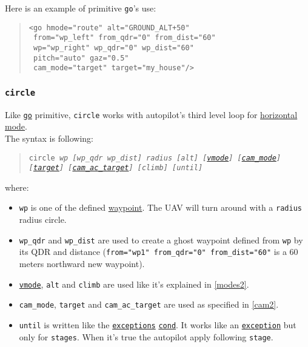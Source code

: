 \documentclass{article}
\renewcommand{\tt}[1]{\texttt{#1}}
\newcommand{\ex}[1]{\colorbox[gray]{0.92}{\tt{#1}}}
\newcommand{\hs}[1]{\hspace*{#1cm}}
\newcommand{\until}{%
	\tt{until} is written like the \tt{\hyperlink{exceptions}{exceptions}}
		\tt{\hyperlink{cond}{cond}}. It works like an
		\tt{\hyperlink{exceptions}{exception}} but only for \tt{stages}.
		When it's true the autopilot apply following \tt{stage}.
}
\newcommand{\qt}[1]{\textcolor{gris75}{#1}}
\begin{document}
\begin{minipage}[ctb]{\textwidth}
Here is an example of primitive \tt{go}'s use:
\begin{quote}
	\ex{<go hmode="\qt{route}" alt="\qt{GROUND\_ALT+50}"} \\ 
	\ex{\hs{0.58} from="\qt{wp\_left}" from\_qdr="\qt{0}" from\_dist="\qt{60}"} \\
	\ex{\hs{0.58} wp="\qt{wp\_right}" wp\_qdr="\qt{0}" wp\_dist="\qt{60}"} \\
	\ex{\hs{0.58} pitch="\qt{auto}" gaz="\qt{0.5}"} \\
	\ex{\hs{0.58} cam\_mode="\qt{target}" target="\qt{my\_house}"/>} \\
\end{quote}
\end{minipage}


\hypertarget{circle}{\subsubsection{\tt{circle}}}
Like \hyperlink{go}{\tt{go}} primitive, \tt{circle} works with autopilot's
third level loop for \hyperlink{horizontalmodes}{horizontal mode}. \\
The syntax is following:

\begin{quote}
	\tt{circle \emph{wp [wp\_qdr wp\_dist] radius [alt]
	[\hyperlink{verticalmodes}{vmode}] [\hyperlink{cam}{cam\_mode}]
	[\hyperlink{cam}{target}] [\hyperlink{cam}{cam\_ac\_target}]
	[climb] [until]}}
\end{quote}


where:
\begin{itemize}
	\item \tt{wp} is one of the defined \hyperlink{waypoints}{waypoint}.
	The UAV will turn around with a \tt{radius} radius circle.
	
	\item \tt{wp\_qdr} and \tt{wp\_dist} are used to create a ghost waypoint
	defined from \tt{wp} by its QDR and distance (\ex{from="\qt{wp1}"
	from\_qdr="\qt{0}" from\_dist="\qt{60}"} is a 60 meters northward
	new waypoint).

	\item \hyperlink{verticalmodes}{\tt{vmode}}, \tt{alt} and \tt{climb} are
	used like it's explained in \autoref{modes2}.

	\item \tt{cam\_mode}, \tt{target} and \tt{cam\_ac\_target} are used as
	specified in \autoref{cam2}.

	\item \until \\
\end{itemize}
\end{document}
